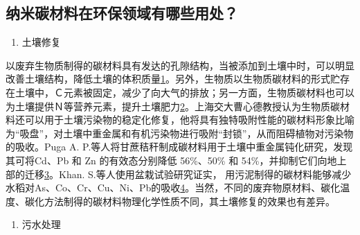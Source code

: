 \documentclass[]{book}
\providecommand{\tightlist}{%
  \setlength{\itemsep}{0pt}\setlength{\parskip}{0pt}}
\begin{document}
\hypertarget{ux7eb3ux7c73ux78b3ux6750ux6599ux5728ux73afux4fddux9886ux57dfux6709ux54eaux4e9bux7528ux5904}{%
\subsection{纳米碳材料在环保领域有哪些用处？}\label{ux7eb3ux7c73ux78b3ux6750ux6599ux5728ux73afux4fddux9886ux57dfux6709ux54eaux4e9bux7528ux5904}}

\begin{enumerate}
\def\labelenumi{\arabic{enumi}.}
\tightlist
\item
  土壤修复
\end{enumerate}

以废弃生物质制得的碳材料具有发达的孔隙结构，当被添加到土壤中时，可以明显改善土壤结构，降低土壤的体积质量\href{陈心想，耿增超。西北农林科技大学学报（自然科学版），2013，41:\%20167-174．}{1}。另外，生物质以生物质碳材料的形式贮存在土壤中，Ｃ元素被固定，减少了向大气的排放；另一方面，生物质碳材料也可以为土壤提供Ｎ等营养元素，提升土壤肥力\href{Kezhen\%20Qian,\%20Ajay\%20Kumar,\%20et.al.\%20Renew.\%20and\%20Sustain.\%20Energy\%20Reviews,\%202015,\%2042:\%201055-1064.}{2}。上海交大曹心德教授认为生物质碳材料还可以用于土壤污染物的稳定化修复，他将具有独特吸附性能的碳材料形象比喻为``吸盘''，对土壤中重金属和有机污染物进行吸附``封锁''，从而阻碍植物对污染物的吸收。Puga A. P.等人将甘蔗秸秆制成碳材料用于土壤中重金属钝化研究，发现其可将Cd、Pb 和 Zn 的有效态分别降低 56\%、50\% 和 54\%，并抑制它们向地上部的迁移\href{Puga\%20A\%20P,\%20Abreu\%20C\%20A,\%20et\%20al.\%20J.\%20of\%20Environ.\%20Manage.,\%202015,\%20159:\%2086–93.}{3}。Khan. S.等人使用盆栽试验研究证实， 用污泥制得的碳材料能够减少水稻对As、Co、Cr、Cu、Ni、Pb的吸收\href{Khan\%20S,\%20Cai\%20Chao,\%20et\%20al．\%20Environ.\%20Sci.\%20\&\%20Technol.,\%202013,\%2047\%20:\%208624-8632．}{4}。当然，不同的废弃物原材料、碳化温度、碳化方法制得的碳材料物理化学性质不同，其土壤修复的效果也有差异。

\begin{enumerate}
\def\labelenumi{\arabic{enumi}.}
\setcounter{enumi}{1}
\tightlist
\item
  污水处理
\end{enumerate}
\end{document}
